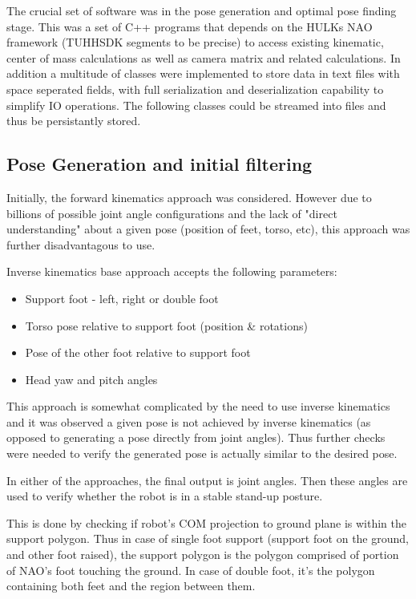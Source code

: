 \documentclass[english, printversion, nomenclature, notitle]{tuvisionthesis} %
\begin{document}
The crucial set of software was in the pose generation and optimal pose finding stage. This was a set of C++ programs that depends on the HULKs NAO framework (TUHHSDK segments to be precise) to access existing kinematic, center of mass calculations as well as camera matrix and related calculations. In addition a multitude of classes were implemented to store data in text files with space seperated fields, with full serialization and deserialization capability to simplify IO operations. The following classes could be streamed into files and thus be persistantly stored.
\subsection{Pose Generation and initial filtering}

Initially, the forward kinematics approach was considered. However due to billions of possible joint angle configurations and the lack of "direct understanding" about a given pose (position of feet, torso, etc), this approach was further disadvantagous to use.

Inverse kinematics base approach accepts the following parameters:
\begin{itemize}
	\item Support foot - left, right or double foot
	\item Torso pose relative to support foot (position \& rotations)
	\item Pose of the other foot relative to support foot
	\item Head yaw and pitch angles
\end{itemize}
This approach is somewhat complicated by the need to use inverse kinematics and it was observed a given pose is not achieved by inverse kinematics (as opposed to generating a pose directly from joint angles). Thus further checks were needed to verify the generated pose is actually similar to the desired pose.

In either of the approaches, the final output is joint angles. Then these angles are used to verify whether the robot is in a stable stand-up posture.

This is done by checking if robot's COM projection to ground plane is within the support polygon. Thus in case of single foot support (support foot on the ground, and other foot raised), the support polygon is the polygon comprised of portion of NAO's foot touching the ground. In case of double foot, it's the polygon containing both feet and the region between them. 
\end{document}
